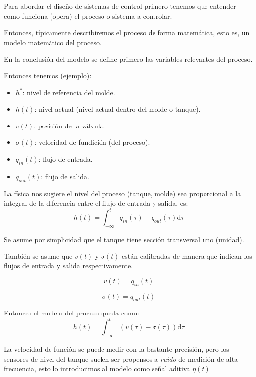 \documentclass[a4paper]{article}
\begin{document}
Para abordar el diseño de sistemas de control primero tenemos que entender como funciona (opera) el proceso o sistema a controlar.

Entonces, típicamente describiremos el proceso de forma matemática, esto es, un modelo matemático del proceso.

En la conclusión del modelo se define primero las variables relevantes del proceso.

Entonces tenemos (ejemplo):
\begin{itemize}
\item $h^*$: nivel de referencia del molde.
\item $h(t)$: nivel actual (nivel actual dentro del molde o tanque).
\item $v(t)$: posición de la válvula.
\item $\sigma(t)$: velocidad de fundición (del proceso).
\item $q_{in}(t)$: flujo de entrada.
\item $q_{out}(t)$: flujo de salida.
\end{itemize}

La física nos sugiere el nivel del proceso (tanque, molde) sea proporcional a la integral de la diferencia entre el flujo de entrada y salida, es:
\begin{equation}\label{eq:altura}
		h(t) = \int_{-\infty}^{t}q_{in} (\tau) - q_{out} (\tau) \mathrm{d}\tau
\end{equation}

Se asume por simplicidad que el tanque tiene sección transversal uno (unidad).

También se asume que $v(t)$ y $\sigma(t)$ están calibradas de manera que indican los flujos de entrada y salida respectivamente.

\begin{equation}\label{eq:valvula}
		v(t) = q_{in} (t)
\end{equation}

\begin{equation}\label{eq:velocidad}
		\sigma (t) = q_{out} (t)
\end{equation}

Entonces el modelo del proceso queda como:
\begin{equation}\label{eq:altura2}
		h(t) = \int_{-\infty}^{t}(v(\tau) - \sigma(\tau)) \mathrm{d}\tau
\end{equation}

La velocidad de función se puede medir con la bastante precisión, pero los sensores de nivel del tanque suelen ser propensos a \emph{ruido} de medición de alta frecuencia, esto lo introducimos al modelo como señal aditiva $\eta(t)$
\end{document}
